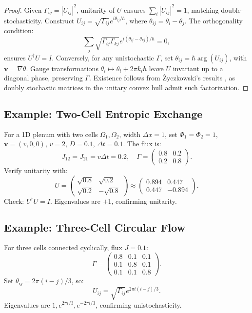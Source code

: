 \documentclass[12pt]{article}
\begin{document}
\begin{proof}
Given \(\Gamma_{ij} = |U_{ij}|^2\), unitarity of \(U\) ensures \(\sum_i |U_{ij}|^2 = 1\), matching double-stochasticity. Construct \(U_{ij} = \sqrt{\Gamma_{ij}} e^{i \theta_{ij} / \hbar}\), where \(\theta_{ij} = \theta_i - \theta_j\). The orthogonality condition:
\[
\sum_j \sqrt{\Gamma_{ij} \Gamma_{kj}} e^{i (\theta_{ij} - \theta_{kj}) / \hbar} = 0,
\]
ensures \(U^\dagger U = I\). Conversely, for any unistochastic \(\Gamma\), set \(\theta_{ij} = \hbar \arg(U_{ij})\), with \(\mathbf{v} = \nabla \theta\). Gauge transformations \(\theta_i \mapsto \theta_i + 2\pi k_i \hbar\) leave \(U\) invariant up to a diagonal phase, preserving \(\Gamma\). Existence follows from Życzkowski’s results \citep{Zyczkowski1994}, as doubly stochastic matrices in the unitary convex hull admit such factorization.
\end{proof}

\subsection{Example: Two-Cell Entropic Exchange}

For a 1D plenum with two cells \(\Omega_1, \Omega_2\), width \(\Delta x = 1\), set \(\Phi_1 = \Phi_2 = 1\), \(\mathbf{v} = (v, 0, 0)\), \(v = 2\), \(D = 0.1\), \(\Delta t = 0.1\). The flux is:
\[
J_{12} = J_{21} = v \Delta t = 0.2, \quad \Gamma = \begin{pmatrix} 0.8 & 0.2 \\ 0.2 & 0.8 \end{pmatrix}.
\]
Verify unitarity with:
\[
U = \begin{pmatrix} \sqrt{0.8} & \sqrt{0.2} \\ \sqrt{0.2} & -\sqrt{0.8} \end{pmatrix} \approx \begin{pmatrix} 0.894 & 0.447 \\ 0.447 & -0.894 \end{pmatrix}.
\]
Check: \(U^\dagger U = I\). Eigenvalues are \(\pm 1\), confirming unitarity.

\subsection{Example: Three-Cell Circular Flow}

For three cells connected cyclically, flux \(J = 0.1\):
\[
\Gamma = \begin{pmatrix} 0.8 & 0.1 & 0.1 \\ 0.1 & 0.8 & 0.1 \\ 0.1 & 0.1 & 0.8 \end{pmatrix}.
\]
Set \(\theta_{ij} = 2\pi (i - j) / 3\), so:
\[
U_{ij} = \sqrt{\Gamma_{ij}} e^{2\pi i (i - j) / 3}.
\]
Eigenvalues are \(1, e^{2\pi i / 3}, e^{-2\pi i / 3}\), confirming unistochasticity.
\end{document}
